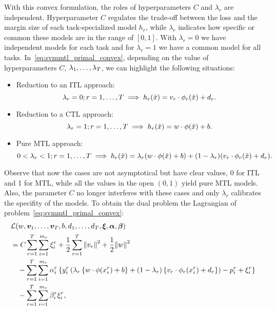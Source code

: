 With this convex formulation, the roles of hyperparameters $C$ and $\lambda_r$ are independent. Hyperparameter $C$ regulates the trade-off between the loss and the margin size of each task-specialized model $h_r$, while $\lambda_r$ indicates how specific or common these models are in the range of $[0, 1]$. With $\lambda_r=0$ we have independent models for each task and for $\lambda_r=1$ we have a common model for all tasks. 
%
In~\eqref{eq:svmmtl_primal_convex}, depending on the value of hyperparameters $C$, $\lambda_1, \ldots, \lambda_T$, we can highlight the following situations:
%
\begin{itemize}
    \item Reduction to an ITL approach:
    $$\lambda_r = 0 ; r=1, \ldots, T \implies h_r(\hat{x}) = {v}_r \cdot \phi_r(\hat{x}) + d_r .$$
    \item Reduction to a CTL approach: 
    $$ \lambda_r = 1 ; r=1, \ldots, T \implies h_r(\hat{x}) = {w} \cdot \phi(\hat{x}) + b .$$
    \item Pure MTL approach:
    $$ 0 < \lambda_r < 1 ; r=1, \ldots, T \implies h_r(\hat{x}) = \lambda_r ({w} \cdot \phi(\hat{x}) + b ) + (1 - \lambda_r) ({v}_r \cdot \phi_r(\hat{x}) + d_r) .$$
\end{itemize}
Observe that now the cases are not asymptotical but have clear values, 0 for ITL and 1 for MTL, while all the values in the open $(0, 1)$ yield pure MTL models. Also, the parameter $C$ no longer interferes with these cases and only $\lambda_r$ calibrates the specifity of the models.
 To obtain the dual problem the Lagrangian of problem~\eqref{eq:svmmtl_primal_convex}:
\begin{equation}\label{eq:svmmtl_lagrangian_convex}
    \begin{aligned}
        & \lagr({w}, \fv{v}_1, \ldots, \fv{v}_\ntasks, b, d_1, \ldots, d_\ntasks, \fv{\xi}, \fv{\alpha}, \fv{\beta}) \\
        &=  C \sum_{r= 1}^T \sum_{i=1}^{m_r} {\xi_{i}^r} + \frac{1}{2} \sum_{r= 1}^T{\norm{{v}_r}^2} + \frac{1}{2} {\norm{{w}}}^2 \\
        &\quad -  \sum_{r= 1}^T \sum_{i=1}^{m_r} \alpha_i^r \left\lbrace y_{i}^r  \left(\lambda_r \left\lbrace {w} \cdot \phi(x_{i}^r) + b  \right\rbrace + (1 - \lambda_r) \left\lbrace {v}_r \cdot \phi_r(x_{i}^r) + d_r \right\rbrace  \right) - p_{i}^r + \xi_{i}^r  \right\rbrace \\
        &\quad -  \sum_{r= 1}^T \sum_{i=1}^{m_r} \beta_i^r \xi_i^r ,
    \end{aligned}
\end{equation}
